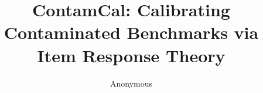 \documentclass[11pt]{article}
\title{ContamCal: Calibrating Contaminated Benchmarks via\\Item Response Theory}
\author{Anonymous}
\begin{document}
\maketitle

\begin{abstract}

\end{abstract}











\end{document}
